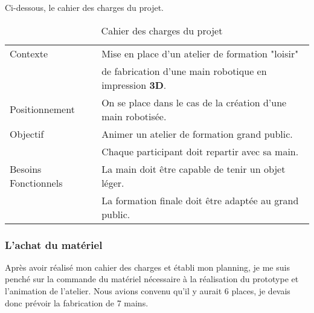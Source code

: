 Ci-dessous, le cahier des charges du projet.

\begin{table}[!h]
    \centering
    \begin{tabular}{|l|l|}
        \hline Contexte & Mise en place d'un atelier de formation "loisir" \\
         & de fabrication d’une main robotique en impression \textbf{3D}. \\
        \hline Positionnement & On se place dans le cas de la création d'une main robotisée. \\
        \hline Objectif & Animer un atelier de formation grand public. \\
         & Chaque participant doit repartir avec sa main. \\
        \hline Besoins Fonctionnels & La main doit être capable de tenir un objet léger. \\
         & La formation finale doit être adaptée au grand public. \\
        \hline
    \end{tabular}
    \caption{\, \, Cahier des charges du projet}
    \label{tab_4.1.2.2}
\end{table}

\newpage

\subsubsection{L'achat du matériel}
Après avoir réalisé mon cahier des charges et établi mon planning, je me suis penché sur la commande du matériel nécessaire à la réalisation du prototype et l'animation de l'atelier. Nous avions convenu qu'il y aurait 6 places, je devais donc prévoir la fabrication de 7 mains.

